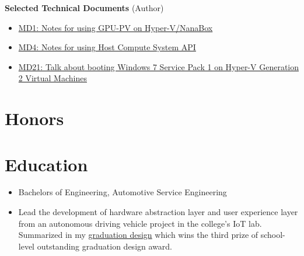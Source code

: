 \documentclass{resume}
\begin{document}
\textbf{Selected Technical Documents} (Author)
\begin{itemize}
  \item \href{https://github.com/MouriNaruto/MouriDocs/tree/main/docs/1}{MD1: Notes for using GPU-PV on Hyper-V/NanaBox}
  \item \href{https://github.com/MouriNaruto/MouriDocs/tree/main/docs/4}{MD4: Notes for using Host Compute System API}
  \item \href{https://github.com/MouriNaruto/MouriDocs/tree/main/docs/21}{MD21: Talk about booting Windows 7 Service Pack 1 on Hyper-V Generation 2 Virtual Machines}
\end{itemize}

\section{Honors}


\section{Education}

\begin{itemize}
  \item Bachelors of Engineering, Automotive Service Engineering
  \item Lead the development of hardware abstraction layer and user experience layer from an autonomous driving vehicle project in the college's IoT lab. Summarized in my \href{https://mouri.moe/assets/Research%20of%20human-computer%20interaction%20system%20for%20autonomous%20driving.pdf}{graduation design} which wins the third prize of school-level outstanding graduation design award.
\end{itemize}
\end{document}
